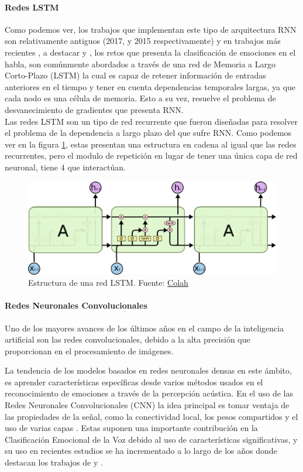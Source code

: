 \documentclass[11pt,a4paper,spanish]{book}
\begin{document}
	\paragraph{Redes LSTM}\hfill \break
	Como podemos ver, los trabajos que implementan este tipo de arquitectura RNN son relativamente antiguos (2017, y 2015 respectivamente) y en trabajos más recientes , a destacar \cite{Wang2020} y \cite{Atmaja2019}, los retos que presenta la clasificación de emociones en el habla, son comúnmente abordados a través de una red de Memoria a Largo Corto-Plazo (LSTM) la cual es capaz de retener información de entradas anteriores en el tiempo y tener en cuenta dependencias temporales largas, ya que cada nodo es una célula de memoria. Esto a su vez, resuelve el problema de desvanecimiento de gradientes que presenta RNN.\\
	Las redes LSTM son un tipo de red recurrente que fueron diseñadas para resolver el problema de la dependencia a largo plazo del que sufre RNN. Como podemos ver en la figura \ref{fig:netLSTM}, estas presentan una estructura en cadena al igual que las redes recurrentes, pero el modulo de repetición en lugar de tener una única capa de red neuronal, tiene 4 que interactúan.
	\begin{figure}[H]
		\centering
		\includegraphics[scale=0.25]{LSTM3-chain.png}
		\caption{Estructura de una red LSTM. Fuente: \href{https://colah.github.io/posts/2015-08-Understanding-LSTMs/}{Colah}}
		\label{fig:netLSTM} 
	\end{figure}
	
	\paragraph{Redes Neuronales Convolucionales}\hfill \break
	Uno de los mayores avances de los últimos años en el campo de la inteligencia artificial son las redes convolucionales, debido a la alta precisión que proporcionan en el procesamiento de imágenes.
	
	La tendencia de los modelos basados en redes neuronales densas en este ámbito, es aprender características específicas desde varios métodos usados en el reconocimiento de emociones a través de la percepción acústica. En el uso de las Redes Neuronales Convolucionales (CNN) la idea principal es tomar ventaja de las propiedades de la señal, como la conectividad local, los pesos compartidos y el uso de varias capas  \cite{Lim2017}. Estas suponen una importante contribución en la Clasificación Emocional de la Voz debido al uso de características significativas, y su uso en recientes estudios se ha incrementado a lo largo de los años donde destacan los trabajos de \cite{AbdulQayyum2019} y \cite{Anvarjon2020}.  %
	
\end{document}
